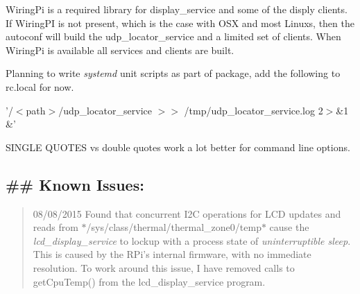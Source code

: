 \begin{DoxyItemize}
\item Wiring\+Pi is a required library for display\+\_\+service and some of the disply clients. If Wiring\+P\+I is not present, which is the case with O\+S\+X and most Linuxs, then the autoconf will build the udp\+\_\+locator\+\_\+service and a limited set of clients. When Wiring\+Pi is available all services and clients are built.
\item Planning to write {\itshape systemd} unit scripts as part of package, add the following to rc.\+local for now.
\begin{DoxyItemize}
\item '/$<$path$>$/udp\+\_\+locator\+\_\+service $>$$>$ /tmp/udp\+\_\+locator\+\_\+service.log 2$>$\&1 \&'
\end{DoxyItemize}
\item S\+I\+N\+G\+L\+E Q\+U\+O\+T\+E\+S vs double quotes work a lot better for command line options.
\end{DoxyItemize}

\subsection*{\#\# Known Issues\+: }

\begin{quote}
08/08/2015 Found that concurrent I2\+C operations for L\+C\+D updates and reads from $\ast$/sys/class/thermal/thermal\+\_\+zone0/temp$\ast$ cause the {\itshape lcd\+\_\+display\+\_\+service} to lockup with a process state of {\itshape uninterruptible sleep}. This is caused by the R\+Pi's internal firmware, with no immediate resolution. To work around this issue, I have removed calls to get\+Cpu\+Temp() from the lcd\+\_\+display\+\_\+service program.\end{quote}
